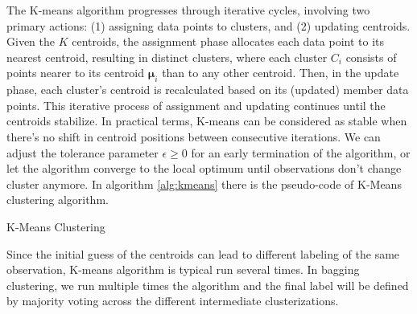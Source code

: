 The K-means algorithm progresses through iterative cycles, involving two primary actions: (1) assigning data points to clusters, and (2) updating centroids. Given the $K$ centroids, the assignment phase allocates each data point to its nearest centroid, resulting in distinct clusters, where each cluster $C_i$ consists of points nearer to its centroid $\bm{\mu}_i$ than to any other centroid. Then, in the update phase, each cluster's centroid is recalculated based on its (updated) member data points. This iterative process of assignment and updating continues until the centroids stabilize. In practical terms, K-means can be considered as stable when there's no shift in centroid positions between consecutive iterations. We can adjust the tolerance parameter $\epsilon \geq 0$ for an early termination of the algorithm, or let the algorithm converge to the local optimum until observations don't change cluster anymore. In algorithm \ref{alg:kmeans} there is the pseudo-code of K-Means clustering algorithm.
\begin{algorithm}
\small
    \caption{K-Means Clustering}
    \label{alg:kmeans}
    \begin{algorithmic}[1]
    \REPEAT
    \ENDFOR
    \ENDFOR
    \end{algorithmic}
\end{algorithm} 
Since the initial guess of the centroids can lead to different labeling of the same observation, K-means algorithm is typical run several times. In bagging clustering, we run multiple times the algorithm and the final label will be defined by majority voting across the different intermediate clusterizations.


